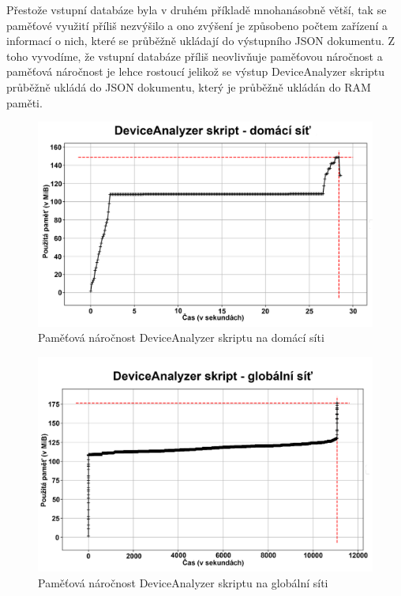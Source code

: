 \documentclass[thesis=B,czech,hidelinks]{FITthesis}[2019/03/21]
\begin{document}
    Přestože vstupní databáze byla v druhém příkladě mnohanásobně větší, tak se paměťové využití příliš nezvýšilo a ono zvýšení je způsobeno počtem zařízení a informací o nich, které se průběžně ukládají do výstupního JSON dokumentu. Z toho vyvodíme, že vstupní databáze příliš neovlivňuje paměťovou náročnost a paměťová náročnost je lehce rostoucí jelikož se výstup DeviceAnalyzer skriptu průběžně ukládá do JSON dokumentu, který je průběžně ukládán do RAM paměti.
    
    \begin{figure}[h!]
        \centering
        \includegraphics[width=\textwidth]{DeviceAnalyzerMemoryUsage.png}
        \caption[Paměťová náročnost: DeviceAnalyzer skriptu na domácí síti]{Paměťová náročnost DeviceAnalyzer skriptu na domácí síti}
        \label{DAMU1}
    \end{figure}
    \begin{figure}[h!]
        \centering
        \includegraphics[width=\textwidth]{GlobalDeleteMemoryUses.png}
        \caption[Paměťová náročnost: DeviceAnalyzer skriptu na globální síti]{Paměťová náročnost DeviceAnalyzer skriptu na globální síti}
        \label{DAMU2}
    \end{figure}
\end{document}
